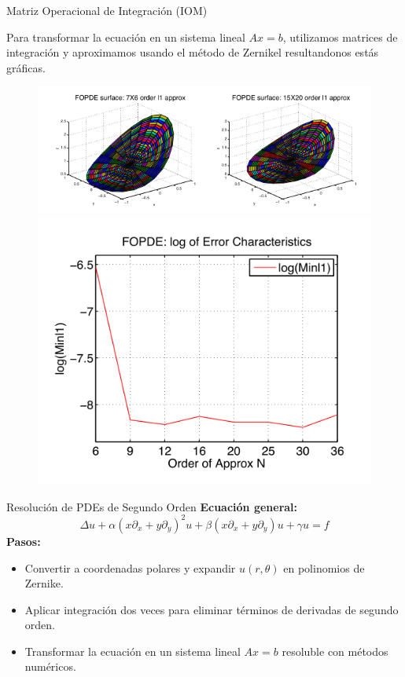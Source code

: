 \documentclass{beamer}
\begin{document}
\begin{frame}{Matriz Operacional de Integración (IOM)}

Para transformar la ecuación en un sistema lineal \( Ax = b \), utilizamos matrices de integración y aproximamos usando el método de Zernikel resultandonos estás gráficas.
  \begin{figure}[H]
\begin{center}
  \includegraphics[scale=0.5]{Figures/polejemplo.png}
  \includegraphics[scale=0.3]{Figures/pol2ejemplo.png}
\end{center}
\end{figure}  
\end{frame}


\begin{frame}{Resolución de PDEs de Segundo Orden}
    \textbf{Ecuación general:}
    \[
    \Delta u + \alpha (x\partial_x + y\partial_y)^2 u + \beta (x\partial_x + y\partial_y) u + \gamma u = f
    \]
    \textbf{Pasos:}
    \begin{itemize}
        \item Convertir a coordenadas polares y expandir \( u(r, \theta) \) en polinomios de Zernike.
        \item Aplicar integración dos veces para eliminar términos de derivadas de segundo orden.
        \item Transformar la ecuación en un sistema lineal \( Ax = b \) resoluble con métodos numéricos.
    \end{itemize}
\end{frame}
\end{document}
